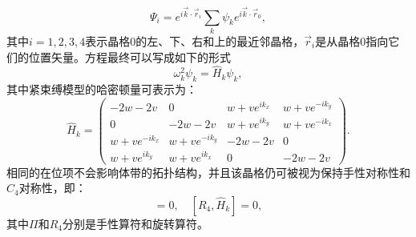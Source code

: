 \begin{equation}\label{eq4-6}
    \Psi_i = e^{i\vec{k} \cdot \vec{r}_i} \sum_{k} \psi_k e^{i\vec{k} \cdot \vec{r}_0},
\end{equation}
其中$i = 1,2,3,4$表示晶格0的左、下、右和上的最近邻晶格，$\vec{r}_i$是从晶格0指向它们的位置矢量。方程最终可以写成如下的形式
\begin{equation}\label{eq4-7}
    \omega_k^2 \psi_k = \hat{H}_k \psi_k,
\end{equation}
其中紧束缚模型的哈密顿量可表示为：
\begin{equation}
\hat{H}_k = 
\begin{pmatrix}
-2w - 2v & 0 & w + ve^{ik_x} & w + ve^{-ik_y} \\
0 & -2w - 2v & w + ve^{ik_y} & w + ve^{-ik_x} \\
w + ve^{-ik_x} & w + ve^{-ik_y} & -2w - 2v & 0 \\
w + ve^{ik_y} & w + ve^{ik_x} & 0 & -2w - 2v
\end{pmatrix}.
\label{eq4-8}
\end{equation}
相同的在位项不会影响体带的拓扑结构，并且该晶格仍可被视为保持手性对称性和\(C_4\)对称性，即：
\begin{equation}
[\Pi, \hat{H}_k + (2w + 2v)\mathbb{I}_{4\times4}] = 0, \quad [R_4, \hat{H}_k] = 0,
\label{eq4-9}
\end{equation}
其中\(\Pi\)和\(R_4\)分别是手性算符和旋转算符。

